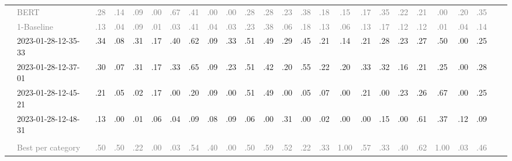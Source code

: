 \begin{table*}
\begin{tabular}{@{}ll@{\hspace{10pt}}c@{\hspace{5pt}}cccccccccccccccccccccc@{}}
& \textcolor{gray}{BERT} & \textcolor{gray}{.28} & \textcolor{gray}{.14} & \textcolor{gray}{.09} & \textcolor{gray}{.00} & \textcolor{gray}{.67} & \textcolor{gray}{.41} & \textcolor{gray}{.00} & \textcolor{gray}{.00} & \textcolor{gray}{.28} & \textcolor{gray}{.28} & \textcolor{gray}{.23} & \textcolor{gray}{.38} & \textcolor{gray}{.18} & \textcolor{gray}{.15} & \textcolor{gray}{.17} & \textcolor{gray}{.35} & \textcolor{gray}{.22} & \textcolor{gray}{.21} & \textcolor{gray}{.00} & \textcolor{gray}{.20} & \textcolor{gray}{.35} \\
& \textcolor{gray}{1-Baseline} & \textcolor{gray}{.13} & \textcolor{gray}{.04} & \textcolor{gray}{.09} & \textcolor{gray}{.01} & \textcolor{gray}{.03} & \textcolor{gray}{.41} & \textcolor{gray}{.04} & \textcolor{gray}{.03} & \textcolor{gray}{.23} & \textcolor{gray}{.38} & \textcolor{gray}{.06} & \textcolor{gray}{.18} & \textcolor{gray}{.13} & \textcolor{gray}{.06} & \textcolor{gray}{.13} & \textcolor{gray}{.17} & \textcolor{gray}{.12} & \textcolor{gray}{.12} & \textcolor{gray}{.01} & \textcolor{gray}{.04} & \textcolor{gray}{.14} \\
& 2023-01-28-12-35-33 & .34 & .08 & .31 & .17 & .40 & .62 & .09 & .33 & .51 & .49 & .29 & .45 & .21 & .14 & .21 & .28 & .23 & .27 & .50 & .00 & .25 \\
& 2023-01-28-12-37-01 & .30 & .07 & .31 & .17 & .33 & .65 & .09 & .23 & .51 & .42 & .20 & .55 & .22 & .20 & .33 & .32 & .16 & .21 & .25 & .00 & .28 \\
& 2023-01-28-12-45-21 & .21 & .05 & .02 & .17 & .00 & .20 & .09 & .00 & .51 & .49 & .00 & .05 & .07 & .00 & .21 & .00 & .23 & .26 & .67 & .00 & .25 \\
& 2023-01-28-12-48-31 & .13 & .00 & .01 & .06 & .04 & .09 & .08 & .09 & .06 & .00 & .31 & .00 & .02 & .00 & .00 & .15 & .00 & .61 & .37 & .12 & .09 \\
\addlinespace
\multicolumn{2}{@{}l}{\emph{New York Times}} \\
& \textcolor{gray}{Best per category} & \textcolor{gray}{.50} & \textcolor{gray}{.50} & \textcolor{gray}{.22} & \textcolor{gray}{.00} & \textcolor{gray}{.03} & \textcolor{gray}{.54} & \textcolor{gray}{.40} & \textcolor{gray}{.00} & \textcolor{gray}{.50} & \textcolor{gray}{.59} & \textcolor{gray}{.52} & \textcolor{gray}{.22} & \textcolor{gray}{.33} & \textcolor{gray}{1.00} & \textcolor{gray}{.57} & \textcolor{gray}{.33} & \textcolor{gray}{.40} & \textcolor{gray}{.62} & \textcolor{gray}{1.00} & \textcolor{gray}{.03} & \textcolor{gray}{.46} \\

\end{tabular}
\end{table*}

